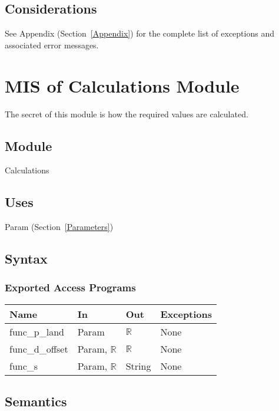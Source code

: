 \documentclass[12pt, titlepage]{article}
\begin{document}
\subsection{Considerations}

See Appendix (Section~\ref{Appendix}) for the complete list of exceptions and
 associated error messages.
 
\newpage

\section{MIS of Calculations Module} \label{Calc}

The secret of this module is how the required values are calculated.

\subsection{Module}

Calculations

\subsection{Uses}

Param (Section~\ref{Parameters})

\subsection{Syntax}

\subsubsection{Exported Access Programs}

\begin{center}
 \begin{tabular}{p{3cm} p{3cm} p{1cm} p{8cm}}
 \hline
 \textbf{Name} & \textbf{In} & \textbf{Out} & \textbf{Exceptions} \\
 \hline
 func\_p\_land & Param & $\mathbb{R}$ & None \\
 \hline
 func\_d\_offset & Param, $\mathbb{R}$ & $\mathbb{R}$ & None \\
 \hline
 func\_s & Param, $\mathbb{R}$ & String & None \\
 \hline
 \end{tabular}
 \end{center}

\subsection{Semantics}
\end{document}
